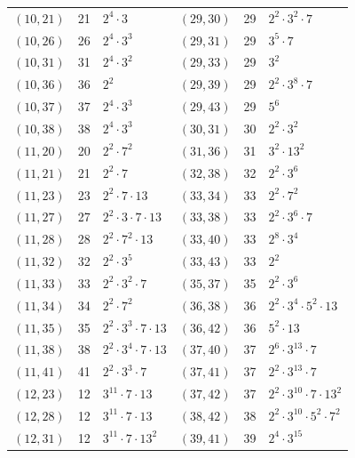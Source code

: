\documentclass[11pt]{article}
\begin{document}
\begin{longtable}{@{}lrl@{\qquad}lrl@{}}
$(10,21)$ & 21 & $2^{4}\cdot 3$ & $(29,30)$ & 29 & $2^{2}\cdot 3^{2}\cdot 7$\\
$(10,26)$ & 26 & $2^{4}\cdot 3^{3}$ & $(29,31)$ & 29 & $3^{5}\cdot 7$\\
$(10,31)$ & 31 & $2^{4}\cdot 3^{2}$ & $(29,33)$ & 29 & $3^{2}$\\
$(10,36)$ & 36 & $2^{2}$ & $(29,39)$ & 29 & $2^{2}\cdot 3^{8}\cdot 7$\\
$(10,37)$ & 37 & $2^{4}\cdot 3^{3}$ & $(29,43)$ & 29 & $5^{6}$\\
$(10,38)$ & 38 & $2^{4}\cdot 3^{3}$ & $(30,31)$ & 30 & $2^{2}\cdot 3^{2}$\\
$(11,20)$ & 20 & $2^{2}\cdot 7^{2}$ & $(31,36)$ & 31 & $3^{2}\cdot 13^{2}$\\
$(11,21)$ & 21 & $2^{2}\cdot 7$ & $(32,38)$ & 32 & $2^{2}\cdot 3^{6}$\\
$(11,23)$ & 23 & $2^{2}\cdot 7\cdot 13$ & $(33,34)$ & 33 & $2^{2}\cdot 7^{2}$\\
$(11,27)$ & 27 & $2^{2}\cdot 3\cdot 7\cdot 13$ & $(33,38)$ & 33 & $2^{2}\cdot 3^{6}\cdot 7$\\
$(11,28)$ & 28 & $2^{2}\cdot 7^{2}\cdot 13$ & $(33,40)$ & 33 & $2^{8}\cdot 3^{4}$\\
$(11,32)$ & 32 & $2^{2}\cdot 3^{5}$ & $(33,43)$ & 33 & $2^{2}$\\
$(11,33)$ & 33 & $2^{2}\cdot 3^{2}\cdot 7$ & $(35,37)$ & 35 & $2^{2}\cdot 3^{6}$\\
$(11,34)$ & 34 & $2^{2}\cdot 7^{2}$ & $(36,38)$ & 36 & $2^{2}\cdot 3^{4}\cdot 5^{2}\cdot 13$\\
$(11,35)$ & 35 & $2^{2}\cdot 3^{3}\cdot 7\cdot 13$ & $(36,42)$ & 36 & $5^{2}\cdot 13$\\
$(11,38)$ & 38 & $2^{2}\cdot 3^{4}\cdot 7\cdot 13$ & $(37,40)$ & 37 & $2^{6}\cdot 3^{13}\cdot 7$\\
$(11,41)$ & 41 & $2^{2}\cdot 3^{3}\cdot 7$ & $(37,41)$ & 37 & $2^{2}\cdot 3^{13}\cdot 7$\\
$(12,23)$ & 12 & $3^{11}\cdot 7\cdot 13$ & $(37,42)$ & 37 & $2^{2}\cdot 3^{10}\cdot 7\cdot 13^{2}$\\
$(12,28)$ & 12 & $3^{11}\cdot 7\cdot 13$ & $(38,42)$ & 38 & $2^{2}\cdot 3^{10}\cdot 5^{2}\cdot 7^{2}$\\
$(12,31)$ & 12 & $3^{11}\cdot 7\cdot 13^{2}$ & $(39,41)$ & 39 & $2^{4}\cdot 3^{15}$\\
\end{longtable}
\endgroup
\end{document}
